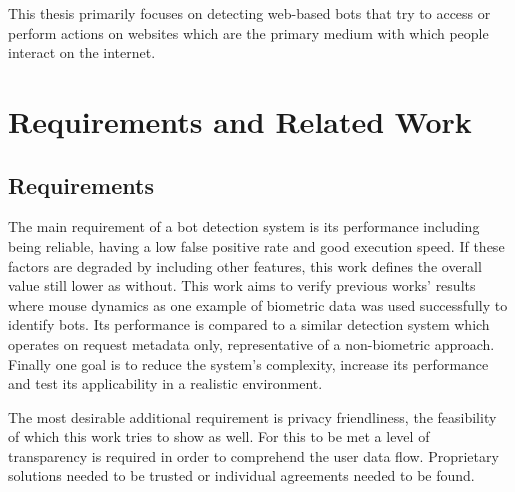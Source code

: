 \documentclass[
    fontsize=12pt,
    headings=small,
    parskip=half,           %
    bibliography=totoc,
    numbers=noenddot,       %
    open=any,               %
    final,                   %
    table
]{scrreprt}
\begin{document}
This thesis primarily focuses on detecting web-based bots that try to access or perform actions on websites which are the primary medium with which people interact on the internet.


\chapter{Requirements and Related Work}


\section{Requirements}

The main requirement of a bot detection system is its performance including being reliable, having a low false positive rate and good execution speed. If these factors are degraded by including other features, this work defines the overall value still lower as without. This work aims to verify previous works' results where mouse dynamics as one example of biometric data was used successfully to identify bots. Its performance is compared to a similar detection system which operates on request metadata only, representative of a non-biometric approach. Finally one goal is to reduce the system's complexity, increase its performance and test its applicability in a realistic environment.

The most desirable additional requirement is privacy friendliness, the feasibility of which this work tries to show as well. For this to be met a level of transparency is required in order to comprehend the user data flow. Proprietary solutions needed to be trusted or individual agreements needed to be found.
\end{document}
